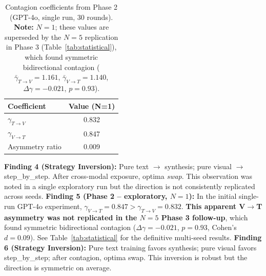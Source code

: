 \documentclass[11pt,a4paper]{article}
\begin{document}

\begin{table}[H]
\centering
\caption{Contagion coefficients from Phase 2 (GPT-4o, single run, 30 rounds). \textbf{Note:} $N=1$; these values are superseded by the $N=5$ replication in Phase 3 (Table~\ref{tab:statistical}), which found symmetric bidirectional contagion ($\bar{\gamma}_{T\to V}=1.161$, $\bar{\gamma}_{V\to T}=1.140$, $\Delta\gamma=-0.021$, $p=0.93$).}
\begin{tabular}{lc}
\toprule
\textbf{Coefficient} & \textbf{Value (N=1)} \\
\midrule
$\gamma_{T\to V}$ & 0.832 \\
$\gamma_{V\to T}$ & 0.847 \\
Asymmetry ratio & 0.009 \\
\bottomrule
\end{tabular}
\end{table}



\textbf{Finding 4 (Strategy Inversion):} Pure text $\to$ synthesis; pure visual $\to$ step\_by\_step. After cross-modal exposure, optima \textit{swap}. This observation was noted in a single exploratory run but the direction is not consistently replicated across seeds. \textbf{Finding 5 (Phase 2 -- exploratory, $N=1$):} In the initial single-run GPT-4o experiment, $\gamma_{V\to T}=0.847 > \gamma_{T\to V}=0.832$. \textbf{This apparent V$\to$T asymmetry was not replicated in the $N=5$ Phase 3 follow-up}, which found symmetric bidirectional contagion ($\Delta\gamma=-0.021$, $p=0.93$, Cohen's $d=0.09$). See Table~\ref{tab:statistical} for the definitive multi-seed results. \textbf{Finding 6 (Strategy Inversion):} Pure text training favors synthesis; pure visual favors step\_by\_step; after contagion, optima swap. This inversion is robust but the direction is symmetric on average.
\end{document}
